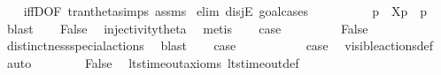 \begin{isabellebody}
\ \ %
\endisadelimproof
%
\isatagproof
{}\isamarkupfalse%
\ iffD{}{\isacharbrackleft}{\kern0pt}OF\ tran{\isacharunderscore}{\kern0pt}theta{\isachardot}{\kern0pt}simps\ assms{\isacharbrackright}{\kern0pt}\isanewline
{}\isamarkupfalse%
\ {\isacharparenleft}{\kern0pt}elim\ disjE{\isacharcomma}{\kern0pt}\ goal{\isacharunderscore}{\kern0pt}cases{\isacharparenright}{\kern0pt}\isanewline
\ \ \isamarkupfalse%
\ {}\isanewline
\ \ \isamarkupfalse%
\ \isamarkupfalse%
\ p{\isacharprime}{\kern0pt}\ \ {\isacartoucheopen}{\isasymtheta}{\isacharbrackleft}{\kern0pt}X{\isacharbrackright}{\kern0pt}{\isacharparenleft}{\kern0pt}p{\isacharparenright}{\kern0pt}\ {\isacharequal}{\kern0pt}\ {\isasymtheta}{\isacharparenleft}{\kern0pt}p{\isacharprime}{\kern0pt}{\isacharparenright}{\kern0pt}{\isacartoucheclose}\ \isamarkupfalse%
\ blast\isanewline
\ \ \isamarkupfalse%
\ False\ \isamarkupfalse%
\ injectivity{\isacharunderscore}{\kern0pt}theta{\isacharparenleft}{\kern0pt}{}{\isacharparenright}{\kern0pt}\ \isamarkupfalse%
\ metis\isanewline
\ \ \isamarkupfalse%
\ {\isacharquery}{\kern0pt}case\ \isacommand{{\isachardot}{\kern0pt}{\isachardot}{\kern0pt}}\isamarkupfalse%
\isanewline
{}\isamarkupfalse%
\isanewline
\ \ \isamarkupfalse%
\ {}\isanewline
\ \ \isamarkupfalse%
\ False\ \isamarkupfalse%
\ distinctness{\isacharunderscore}{\kern0pt}special{\isacharunderscore}{\kern0pt}actions\ \isamarkupfalse%
\ blast\isanewline
\ \ \isamarkupfalse%
\ {\isacharquery}{\kern0pt}case\ \isacommand{{\isachardot}{\kern0pt}{\isachardot}{\kern0pt}}\isamarkupfalse%
\isanewline
{}\isamarkupfalse%
\isanewline
\ \ \isamarkupfalse%
\ {}\isanewline
\ \ \isamarkupfalse%
\ \isamarkupfalse%
\ {\isacharquery}{\kern0pt}case\ \isamarkupfalse%
\ visible{\isacharunderscore}{\kern0pt}actions{\isacharunderscore}{\kern0pt}def\ \isamarkupfalse%
\ auto\isanewline
{}\isamarkupfalse%
\isanewline
\ \ \isamarkupfalse%
\ {}\isanewline
\ \ \isamarkupfalse%
\ False\ \isamarkupfalse%
\ lts{\isacharunderscore}{\kern0pt}timeout{\isacharunderscore}{\kern0pt}axioms\ lts{\isacharunderscore}{\kern0pt}timeout{\isacharunderscore}{\kern0pt}def\ \isamarkupfalse%

\end{isabellebody}
